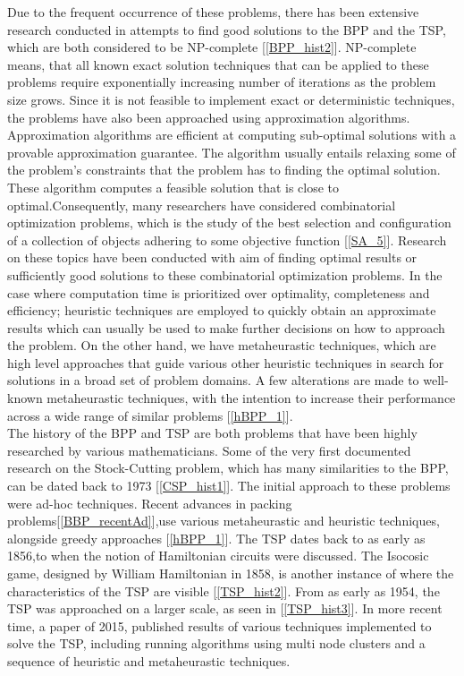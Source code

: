 Due to the frequent occurrence of these problems, there has been extensive research conducted in attempts to find good solutions to the BPP and the TSP, which are both considered to be NP-complete [\ref{BPP_hist2}]. NP-complete means, that all known exact solution techniques that can be applied to these problems require exponentially increasing number of iterations as the problem size grows.  Since it is not feasible to implement exact or deterministic techniques, the problems have also been approached using approximation algorithms. Approximation algorithms are efficient at computing sub-optimal solutions with a provable approximation guarantee. The algorithm usually entails relaxing some of the problem's constraints that the problem has to finding the optimal solution. These algorithm computes a feasible solution that is close to optimal.Consequently, many researchers have considered combinatorial optimization problems, which is the study of the best selection and configuration of a collection of objects adhering to some objective function [\ref{SA_5}]. Research on these topics have been conducted with aim of finding optimal results or sufficiently good solutions to these combinatorial optimization problems. In the case where computation time is prioritized over optimality, completeness and efficiency;  heuristic techniques are employed to quickly obtain an approximate results which can usually be used to make further decisions on how to approach the problem. On the other hand, we have metaheurastic techniques, which are high level approaches that guide various other heuristic techniques in search for solutions in a broad set of problem domains. A few alterations are made to well-known metaheurastic techniques, with the intention to increase their performance across a wide range of similar problems [\ref{hBPP_1}]. \\
The history of the BPP and TSP are both problems that have been highly researched by various mathematicians. Some of the very first documented research on the Stock-Cutting problem, which has many similarities to the BPP, can be dated back to 1973 [\ref{CSP_hist1}]. The initial approach to these problems were ad-hoc techniques. Recent advances in packing problems[\ref{BBP_recentAd}],use various metaheurastic and heuristic techniques, alongside greedy approaches [\ref{hBPP_1}]. The TSP dates back to as early as 1856,to when the notion of Hamiltonian circuits were discussed. The Isocosic game, designed by William Hamiltonian in 1858, is another instance of  where the characteristics of the TSP are visible [\ref{TSP_hist2}]. From as early as 1954, the TSP was approached on a larger scale, as seen in [\ref{TSP_hist3}]. In more recent time, a paper of 2015, published results of various techniques implemented to solve the TSP, including running algorithms using multi node clusters and a sequence of heuristic and metaheurastic techniques. 
